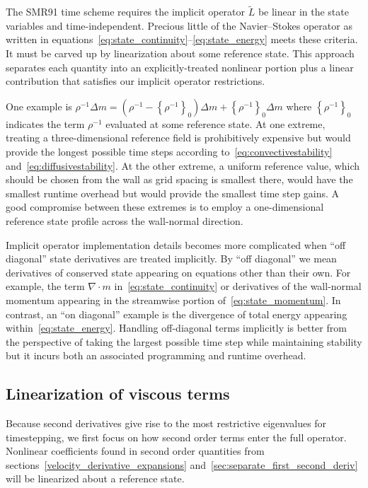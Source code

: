 \documentclass[letterpaper,11pt,nointlimits,reqno,draft]{amsbook}
\newcommand{\reference}[1]{\ensuremath{\left\{#1\right\}_{0}}}
\newcommand{\lessreference}[1]
  {\ensuremath{\left({#1}-\reference{#1}\right)}}
\begin{document}
The SMR91 time scheme requires the implicit operator $\tilde{L}$ be linear in
the state variables and time-independent.  Precious little of the
Navier--Stokes operator as written in
equations~\eqref{eq:state_continuity}--\eqref{eq:state_energy} meets these
criteria.  It must be carved up by linearization about some reference state.
This approach separates each quantity into an explicitly-treated nonlinear
portion plus a linear contribution that satisfies our implicit operator
restrictions.

One example is $\rho^{-1}\Delta{}m = \lessreference{\rho^{-1}}\Delta{}m +
\reference{\rho^{-1}}\Delta{}m$ where $\reference{\rho^{-1}}$ indicates the
term $\rho^{-1}$ evaluated at some reference state.  At one extreme, treating a
three-dimensional reference field is prohibitively expensive but would provide
the longest possible time steps according to~\eqref{eq:convectivestability}
and~\eqref{eq:diffusivestability}.  At the other extreme, a uniform reference
value, which should be chosen from the wall as grid spacing is smallest there,
would have the smallest runtime overhead but would provide the smallest time
step gains.  A good compromise between these extremes is to employ a
one-dimensional reference state profile across the wall-normal direction.

Implicit operator implementation details becomes more complicated when ``off
diagonal'' state derivatives are treated implicitly.  By ``off diagonal'' we
mean derivatives of conserved state appearing on equations other than their
own.  For example, the term $\nabla\cdot{}m$ in~\eqref{eq:state_continuity} or
derivatives of the wall-normal momentum appearing in the streamwise portion
of~\eqref{eq:state_momentum}.  In contrast, an ``on diagonal'' example is the
divergence of total energy appearing within~\eqref{eq:state_energy}.  Handling
off-diagonal terms implicitly is better from the perspective of taking the
largest possible time step while maintaining stability but it incurs both an
associated programming and runtime overhead.

\subsection{Linearization of viscous terms}

Because second derivatives give rise to the most restrictive eigenvalues for
timestepping, we first focus on how second order terms enter the full operator.
Nonlinear coefficients found in second order quantities from
sections~\ref{velocity_derivative_expansions}
and~\ref{sec:separate_first_second_deriv} will be linearized about a reference
state.
\end{document}

